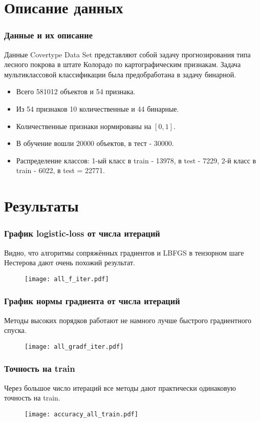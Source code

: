 \documentclass[12pt]{beamer}
\begin{document}
\section{Описание данных}
\begin{frame}
\frametitle{Данные и их описание}
Данные Covertype Data Set представляют собой задачу прогнозирования типа лесного покрова в штате Колорадо по картографическим признакам. Задача мультиклассовой классификации была предобработана в задачу бинарной.
\newline
\begin{itemize}
	\item Всего 581012 объектов и 54 признака.
	\item Из 54 признаков 10 количественные и 44 бинарные.
	\item Количественные признаки нормированы на $[0, 1]$.
	\item В обучение вошли 20000 объектов, в тест - 30000.
	\item Распределение классов: 1-ый класс в train - 13978, в test - 7229, 2-й класс в train - 6022, в test = 22771.
\end{itemize}
\end{frame}

\section{Результаты}
\begin{frame}
\frametitle{График logistic-loss от числа итераций}
Видно, что алгоритмы сопряжённых градиентов и LBFGS в тензорном шаге Нестерова дают очень похожий результат.
\begin{figure}
\texttt{[image: all\_f\_iter.pdf]}
\end{figure}
\end{frame}

\begin{frame}
\frametitle{График нормы градиента от числа итераций}
Методы высоких порядков работают не намного лучше быстрого градиентного спуска.
\begin{figure}
	\texttt{[image: all\_gradf\_iter.pdf]}
\end{figure}
\end{frame}

\begin{frame}
\frametitle{Точность на train}
Через большое число итераций все методы дают практически одинаковую точность на train.
\begin{figure}
	\texttt{[image: accuracy\_all\_train.pdf]}
\end{figure}
\end{frame}
\end{document}
